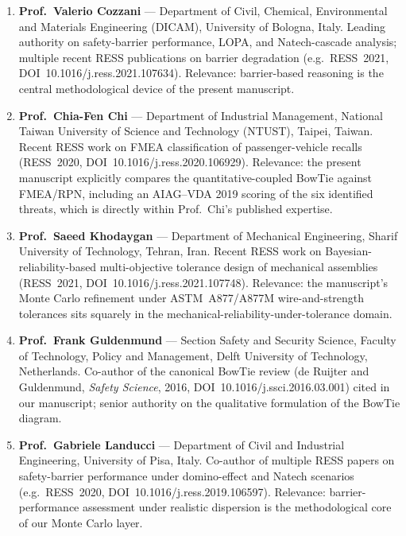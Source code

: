 \documentclass[11pt,a4paper]{article}
\begin{document}
\begin{enumerate}
\item \textbf{Prof.\ Valerio Cozzani} --- Department of Civil,
Chemical, Environmental and Materials Engineering (DICAM), University
of Bologna, Italy. Leading authority on safety-barrier performance,
LOPA, and Natech-cascade analysis; multiple recent RESS publications
on barrier degradation (e.g.\ RESS~2021, DOI~10.1016/j.ress.2021.107634).
Relevance: barrier-based reasoning is the central methodological
device of the present manuscript.

\item \textbf{Prof.\ Chia-Fen Chi} --- Department of Industrial
Management, National Taiwan University of Science and Technology
(NTUST), Taipei, Taiwan. Recent RESS work on FMEA classification of
passenger-vehicle recalls (RESS~2020,
DOI~10.1016/j.ress.2020.106929). Relevance: the present manuscript
explicitly compares the quantitative-coupled BowTie against
FMEA/RPN, including an AIAG--VDA 2019 scoring of the six identified
threats, which is directly within Prof.\ Chi's published expertise.

\item \textbf{Prof.\ Saeed Khodaygan} --- Department of Mechanical
Engineering, Sharif University of Technology, Tehran, Iran. Recent
RESS work on Bayesian-reliability-based multi-objective tolerance
design of mechanical assemblies (RESS~2021,
DOI~10.1016/j.ress.2021.107748). Relevance: the manuscript's Monte
Carlo refinement under ASTM~A877/A877M wire-and-strength tolerances
sits squarely in the mechanical-reliability-under-tolerance domain.

\item \textbf{Prof.\ Frank Guldenmund} --- Section Safety and Security
Science, Faculty of Technology, Policy and Management, Delft
University of Technology, Netherlands. Co-author of the canonical
BowTie review (de Ruijter and Guldenmund, \emph{Safety Science},
2016, DOI~10.1016/j.ssci.2016.03.001) cited in our manuscript;
senior authority on the qualitative formulation of the BowTie
diagram.

\item \textbf{Prof.\ Gabriele Landucci} --- Department of Civil and
Industrial Engineering, University of Pisa, Italy. Co-author of
multiple RESS papers on safety-barrier performance under
domino-effect and Natech scenarios (e.g.\ RESS~2020,
DOI~10.1016/j.ress.2019.106597). Relevance: barrier-performance
assessment under realistic dispersion is the methodological core of
our Monte Carlo layer.
\end{enumerate}
\end{document}
